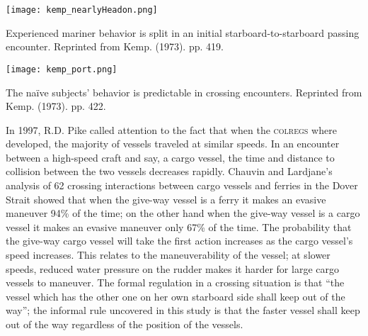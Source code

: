 \documentclass[twoside,symmetric,notoc]{tufte-book}
\begin{document}
{\begin{marginfigure}[-7.4in]
\centering
	\texttt{[image: kemp\_nearlyHeadon.png]}
	\caption[Experienced mariner behavior is split in an initial starboard-to-starboard passing encounter.]{Experienced mariner behavior is split in an initial starboard-to-starboard passing encounter. Reprinted from Kemp. (1973). pp. 419.}
	\label{fig:kempNearlyHeadOn}
	\forcerectofloat
\end{marginfigure}
\begin{marginfigure}[-3.2in]
\centering
	\texttt{[image: kemp\_port.png]}
	\caption[The na\"ive subjects' behavior is predictable in crossing encounters.]{The na\"ive subjects' behavior is predictable in crossing encounters. Reprinted from Kemp. (1973). pp. 422.}
	\label{fig:kempPort}
	\forcerectofloat
\end{marginfigure}
}
\par{
In 1997, R.D. Pike called attention to the fact that when the \textsc{colregs} where developed, the majority of vessels traveled at similar speeds. In an encounter between a high-speed craft and say, a cargo vessel, the time and distance to collision between the two vessels decreases rapidly\cite{Pike}. Chauvin and Lardjane's analysis of 62 crossing interactions between cargo vessels and ferries in the Dover Strait showed that when the give-way vessel is a ferry it makes an evasive maneuver 94\% of the time; on the other hand when the give-way vessel is a cargo vessel it makes an evasive maneuver only 67\% of the time. The probability that the give-way cargo vessel will take the first action increases as the cargo vessel's speed increases. This relates to the maneuverability of the vessel; at slower speeds, reduced water pressure on the rudder makes it harder for large cargo vessels to maneuver. The formal regulation in a crossing situation is that ``the vessel which has the other one on her own starboard side shall keep out of the way'';\cite{USCG} the informal rule uncovered in this study is that the faster vessel shall keep out of the way regardless of the position of the vessels.\cite{Chauvin}
}
\end{document}
